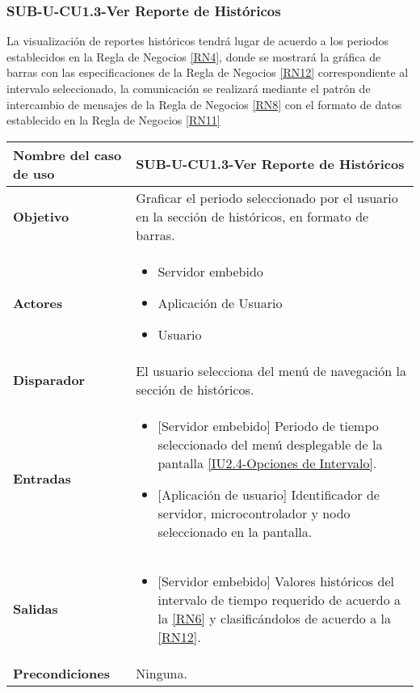 \subsubsection{SUB-U-CU1.3-Ver Reporte de Históricos}\label{SUB-U-CU1.3}
La visualización de reportes históricos tendrá lugar de acuerdo a los periodos establecidos en la Regla de Negocios \ref{RN4}, donde se mostrará la gráfica de barras con las especificaciones de la Regla de Negocios \ref{RN12} correspondiente al intervalo seleccionado, la comunicación se realizará mediante el patrón de intercambio de mensajes de la Regla de Negocios \ref{RN8} con el formato de datos establecido en la Regla de Negocios \ref{RN11}

\begin{longtable}{|J{5cm}|J{10.3cm}|}
	\hline
	\textbf{Nombre del caso de uso} &
		SUB-U-CU1.3-Ver Reporte de Históricos \\ \hline
	\textbf{Objetivo} &
		Graficar el periodo seleccionado por el usuario en la sección de históricos, en formato de barras. \\ \hline
	\textbf{Actores} &
		\begin{itemize}
			\item Servidor embebido
			\item Aplicación de Usuario
			\item Usuario 
		\end{itemize} \\ \hline
	\textbf{Disparador} & 
		El usuario selecciona del menú de navegación la sección de históricos. \\ \hline 
	\textbf{Entradas} & 
		\begin{itemize}
			\item{[Servidor embebido]} Periodo de tiempo seleccionado del menú desplegable de la pantalla \hyperref[fig:Opciones de Intervalo]{[IU2.4-Opciones de Intervalo]}.
			\item{[Aplicación de usuario]} Identificador de servidor, microcontrolador y nodo seleccionado en la pantalla.
		\end{itemize}\\ \hline 
	\textbf{Salidas} & 
		\begin{itemize}
			\item{[Servidor embebido]} Valores históricos del intervalo de tiempo requerido de acuerdo a la \ref{RN6} y clasificándolos de acuerdo a la \ref{RN12}.
		\end{itemize} \\ \hline
	\textbf{Precondiciones} &
		Ninguna.\\ \hline

\end{longtable}
